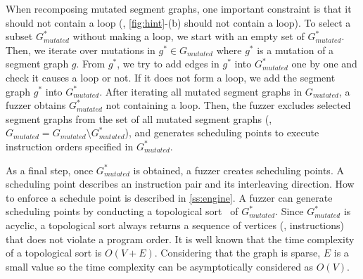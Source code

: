 When recomposing mutated segment graphs, one important constraint is
that it should not contain a loop (\ie, \autoref{fig:hint}-(b) should
not contain a loop). 
%
To select a subset $G^*_{mutated}$ without making a loop, we start
with an empty set of $G^*_{mutated}$. Then, we iterate over mutations
in $g^* \in G_{mutated}$ where $g^*$ is a mutation of a segment graph $g$.
From $g^*$, we try to add edges in
$g^*$ into $G^*_{mutated}$ one by one and check it causes a loop or not. If it does not form a loop, we add the segment graph $g^*$ into $G^*_{mutated}$.
%
After iterating all mutated segment graphs in $G_{mutated}$,
a fuzzer obtains $G^*_{mutated}$ not containing a loop. Then, 
the fuzzer excludes selected segment graphs from the set of 
all mutated segment graphs
(\ie, $G_{mutated} = G_{mutated} \setminus G^*_{mutated}$), and
generates scheduling points to execute instruction orders 
specified in $G^*_{mutated}$.

%
As a final step, once $G^{*}_{mutated}$ is obtained, a fuzzer 
creates scheduling points. A scheduling point describes an instruction 
pair and its interleaving direction. How to enforce a schedule point is 
described in \autoref{ss:engine}.
A fuzzer can generate scheduling points by conducting a topological sort~\cite{topologicalsort} of $G^{*}_{mutated}$.
%
Since $G^{*}_{mutated}$ is acyclic, a topological sort
always returns a sequence of vertices (\ie, instructions) that does
not violate a program order.
%
%
It is well known that the time complexity of a topological sort is
$O(V+E)$. Considering that the graph is sparse, $E$ is a small value
so the time complexity can be asymptotically considered as $O(V)$.
%




